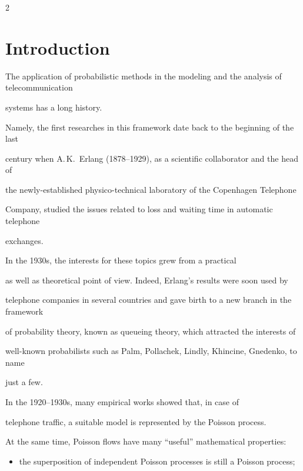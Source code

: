       \begin{multicols}{2}



            \label{st\stat}



\section{Introduction}



\noindent

The application of probabilistic methods in the modeling and the analysis of telecommunication 

systems has a long history.

Namely, the first researches in this framework date back to the beginning of the last 

century when A.\,K.~Erlang (1878--1929), as a scientific collaborator and the head of 

the newly-established physico-technical laboratory of the Copenhagen Telephone 

Company, studied the issues related to loss and waiting time in automatic telephone 

exchanges.

In the 1930s, the interests for these topics grew from a practical 

as well as theoretical point of view. Indeed, Erlang's results were soon used by 

telephone companies in several countries and gave birth to a new branch  in the framework 

of probability theory, known as queueing theory, which attracted the interests of 

well-known probabilists such as Palm, Pollachek, Lindly, Khincine, Gnedenko, to name 

just a few.     



In the 1920--1930s, many empirical works showed that, in case of 

telephone traffic, a suitable model is represented by the Poisson process. 

At the same time, Poisson flows have many ``useful'' mathematical properties:

\begin{itemize}

\item the superposition of independent Poisson processes is still a Poisson process;    


\end{itemize}
\end{multicols}

